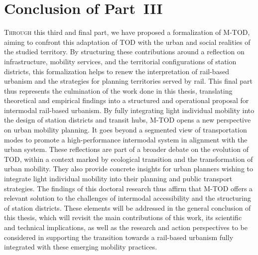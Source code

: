 
\cleardoublepage
\section*{Conclusion of Part~III
    \label{part3:conclusion}
    }

\lettrine[lines=3, findent=8pt, nindent=0pt]{ T}{hrough} this third and final part, we have proposed a formalization of \acrshort{M-TOD}, aiming to confront this adaptation of \acrshort{TOD} with the urban and social realities of the studied territory. By structuring these contributions around a reflection on infrastructure, mobility services, and the territorial configurations of station districts, this formalization helps to renew the interpretation of rail-based urbanism and the strategies for planning territories served by rail. This final part thus represents the culmination of the work done in this thesis, translating theoretical and empirical findings into a structured and operational proposal for intermodal rail-based urbanism. By fully integrating light individual mobility into the design of station districts and transit hubs, \acrshort{M-TOD} opens a new perspective on urban mobility planning. It goes beyond a segmented view of transportation modes to promote a high-performance intermodal system in alignment with the urban system. These reflections are part of a broader debate on the evolution of \acrshort{TOD}, within a context marked by ecological transition and the transformation of urban mobility. They also provide concrete insights for urban planners wishing to integrate light individual mobility into their planning and public transport strategies. The findings of this doctoral research thus affirm that \acrshort{M-TOD} offers a relevant solution to the challenges of intermodal accessibility and the structuring of station districts. These elements will be addressed in the general conclusion of this thesis, which will revisit the main contributions of this work, its scientific and technical implications, as well as the research and action perspectives to be considered in supporting the transition towards a rail-based urbanism fully integrated with these emerging mobility practices.%
